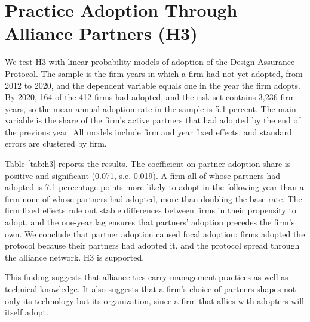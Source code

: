\documentclass[12pt]{article}
\begin{document}
\section{Practice Adoption Through Alliance Partners (H3)}

We test H3 with linear probability models of adoption of the Design Assurance Protocol. The sample is the firm-years in which a firm had not yet adopted, from 2012 to 2020, and the dependent variable equals one in the year the firm adopts. By 2020, 164 of the 412 firms had adopted, and the risk set contains 3,236 firm-years, so the mean annual adoption rate in the sample is 5.1 percent. The main variable is the share of the firm's active partners that had adopted by the end of the previous year. All models include firm and year fixed effects, and standard errors are clustered by firm.

Table \ref{tab:h3} reports the results. The coefficient on partner adoption share is positive and significant (0.071, s.e. 0.019). A firm all of whose partners had adopted is 7.1 percentage points more likely to adopt in the following year than a firm none of whose partners had adopted, more than doubling the base rate. The firm fixed effects rule out stable differences between firms in their propensity to adopt, and the one-year lag ensures that partners' adoption precedes the firm's own. We conclude that partner adoption caused focal adoption: firms adopted the protocol because their partners had adopted it, and the protocol spread through the alliance network. H3 is supported.

This finding suggests that alliance ties carry management practices as well as technical knowledge. It also suggests that a firm's choice of partners shapes not only its technology but its organization, since a firm that allies with adopters will itself adopt.
\end{document}
